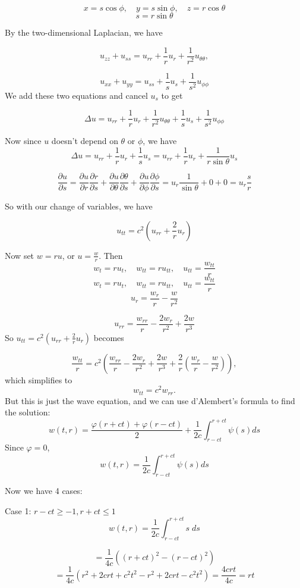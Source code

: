 \documentclass[
]{article}
\begin{document}
\[x=s \cos{\phi}, \quad y=s \sin{\phi}, \quad z=r \cos{\theta}\]
\[s=r \sin{\theta}\]

By the two-dimensional Laplacian, we have

\[u_{zz}+u_{ss}=u_{rr}+\frac{1}{r}u_r+\frac{1}{r^2}u_{\theta\theta},\]

\[u_{xx}+u_{yy}=u_{ss}+\frac{1}{s}u_s+\frac{1}{s^2}u_{\phi\phi}\] We add
these two equations and cancel \(u_s\) to get

\[\Delta u = u_{rr}+\frac{1}{r}u_r+\frac{1}{r^2}u_{\theta\theta}+\frac{1}{s}u_s+\frac{1}{s^2}u_{\phi\phi}\]

Now since \(u\) doesn't depend on \(\theta\) or \(\phi\), we have
\[\Delta u = u_{rr}+\frac{1}{r}u_r+\frac{1}{s}u_s=u_{rr}+\frac{1}{r}u_r+\frac{1}{r \sin{\theta}}u_s\]

\[ \frac{\partial u}{\partial s} = \frac{\partial u}{\partial r} \frac{\partial r}{\partial s}+\frac{\partial u}{\partial\theta}\frac{\partial\theta}{\partial s}+\frac{\partial u}
{\partial\phi}\frac{\partial\phi}{\partial s}=u_r\frac{1}{ \sin{\theta}}+0+0=u_r\frac{s}{ r}\]

So with our change of variables, we have

\[u_{tt}=c^2 \left(u_{rr} + \frac{2}{r}u_r \right)\]

Now set \(w=ru\), or \(u= \frac{w}{r}\). Then
\[w_t=ru_t, \quad w_{tt}=ru_{tt}, \quad u_{tt}= \frac{w_{tt}}{r} \]
\[w_t=ru_t, \quad w_{tt}=ru_{tt}, \quad u_{tt}= \frac{w_{tt}}{r} \]
\[u_r = \frac{w_r}{r}-\frac{w}{r^2} \]

\[u_{rr} = \frac{w_{rr}}{r}-\frac{2w_r}{r^2}+\frac{2w}{r^3} \] So
\(u_{tt}=c^2 \left(u_{rr} + \frac{2}{r}u_r \right)\) becomes

\[\frac{w_{tt}}{r} =c^2 \left(\frac{w_{rr}}{r}-\frac{2w_r}{r^2}+\frac{2w}{r^3} + \frac{2}{r} \left(\frac{w_r}{r}-\frac{w}{r^2} \right) \right),\]
which simplifies to \[w_{tt}=c^2 w_{rr}.\] But this is just the wave
equation, and we can use d'Alembert's formula to find the solution:
\[w(t,r)= \frac{\varphi(r+ct)+\varphi(r-ct)}{2}+\frac{1}{2c} \int_{r-ct}^{r+ct}{\psi(s)ds}\]
Since \(\varphi=0\),
\[w(t,r)= \frac{1}{2c} \int_{r-ct}^{r+ct}{\psi(s)ds}\]

Now we have 4 cases:

Case 1: \(r-ct \geq -1, r+ct \leq 1\)
\[w(t,r)= \frac{1}{2c} \int_{r-ct}^{r+ct}{s\;ds}\]

\[= \frac{1}{4c} ((r+ct)^2-(r-ct)^2)\]
\[= \frac{1}{4c}(r^2+2crt+c^2t^2-r^2+2crt-c^2t^2)= \frac{4crt}{4c}=rt  \]
\end{document}
